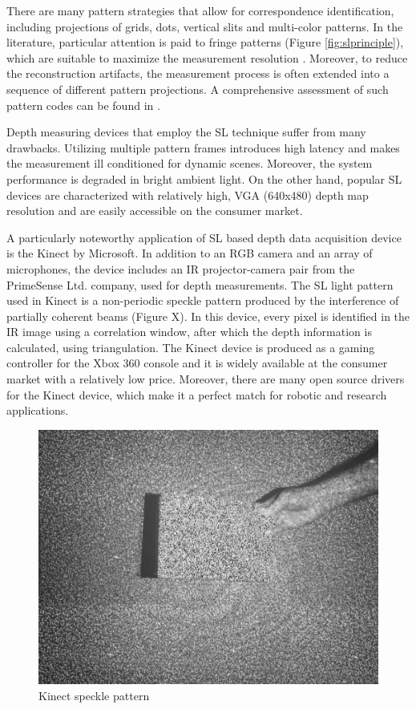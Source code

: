 	There are many pattern strategies that allow for correspondence identification, including projections of grids, dots, vertical slits and multi-color patterns. In the literature, particular attention is paid to fringe patterns (Figure \ref{fig:slprinciple}), which are suitable to maximize the measurement resolution \cite{sensors}. Moreover, to reduce the reconstruction artifacts, the measurement process is often extended into a sequence of different pattern projections. A comprehensive assessment of such pattern codes can be found in \cite{slcodes}.
	
	Depth measuring devices that employ the SL technique suffer from many drawbacks. Utilizing multiple pattern frames introduces high latency and makes the measurement ill conditioned for dynamic scenes. Moreover, the system performance is degraded in bright ambient light. On the other hand, popular SL devices are characterized with relatively high, VGA (640x480) depth map resolution and are easily accessible on the consumer market.


	A particularly noteworthy application of SL based depth data acquisition device is the Kinect by Microsoft. In addition to an RGB camera and an array of microphones, the device includes an IR projector-camera pair from the PrimeSense Ltd. company, used for depth measurements. The SL light pattern used in Kinect is a non-periodic speckle pattern produced by the interference of partially coherent beams (Figure X). In this device, every pixel is identified in the IR image using a correlation window, after which the depth information is calculated, using triangulation. The Kinect device is produced as a gaming controller for the Xbox 360 console and it is widely available at the consumer market with a relatively low price. Moreover, there are many open source drivers for the Kinect device, which make it a perfect match for robotic and research applications.
	
\begin{figure}[H]
\centering
\includegraphics[scale=0.25]{fig/KinectSpeckle}
\caption{Kinect speckle pattern \cite{borenstein2012making}}
\label{fig:kinectspeckle}
\end{figure}
	


